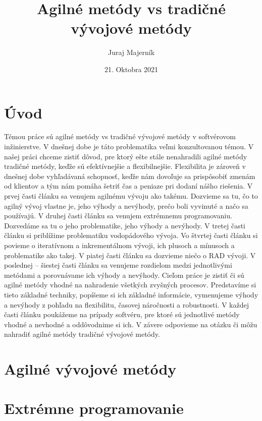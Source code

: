 \documentclass{article}
\begin{document}
\title{Agilné metódy vs tradičné vývojové metódy}
\author{Juraj Majerník}
\date{21. Oktobra 2021}
\maketitle
\begin{abstract}
\end{abstract}
\section{Úvod}
Témou práce sú agilné metódy vs tradičné vývojové metódy v softvérovom inžinierstve. V dnešnej dobe je táto problematika veľmi konzultovanou témou. 
V našej práci chceme zistiť dôvod, pre ktorý ešte stále nenahradili agilné metódy tradičné metódy, keďže sú efektívnejšie a flexibilnejšie. Flexibilita je zároveň v dnešnej dobe vyhľadávaná schopnosť, keďže nám dovoľuje sa prispôsobiť zmenám od klientov a tým nám pomáha šetriť čas a peniaze pri dodaní nášho riešenia. 
V prvej časti článku sa venujem agilnému vývoju ako takému. Dozvieme sa tu, čo to agilný vývoj vlastne je, jeho výhody a nevýhody, prečo boli vyvinuté a načo sa používajú. 
V druhej časti článku sa venujem extrémnemu programovaniu. Dozvedáme sa tu o jeho problematike, jeho výhody a nevýhody. 
V tretej časti článku si priblížime problematiku vodopádového vývoja. 
Vo štvrtej časti článku si povieme o iteratívnom a inkrementálnom vývoji, ich plusoch a mínusoch a problematike ako takej. 
V piatej časti článku sa dozvieme niečo o RAD vývoji. 
V poslednej – šiestej časti článku sa venujeme rozdielom medzi jednotlivými metódami a porovnávame ich výhody a nevýhody. 
Cieľom práce je zistiť či sú agilné metódy vhodné na nahradenie všetkých zvyšných procesov. Predstavíme si tieto základné techniky, popíšeme si ich základné informácie, vymenujeme výhody a nevýhody z pohľadu na flexibilitu, časovej náročnosti a robustnosti. V každej časti článku poukážeme na prípady softvéru, pre ktoré sú jednotlivé metódy vhodné a nevhodné a oddôvodnime si ich. V závere odpovieme na otázku či môžu nahradiť agilné metódy tradičné vývojové metódy.

\section{Agilné vývojové metódy}

\section{Extrémne programovanie}
\end{document}
